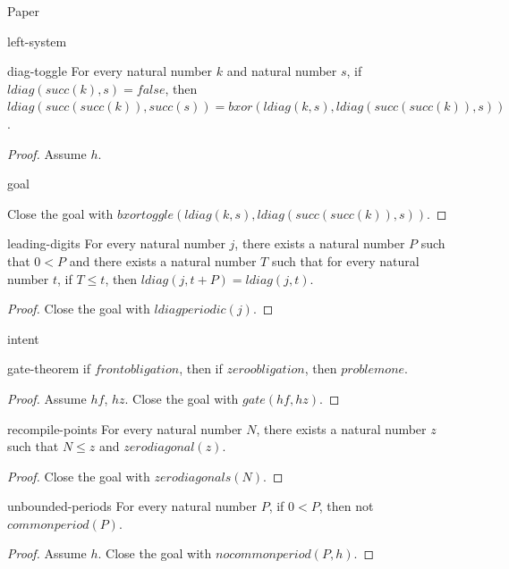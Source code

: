\begin{lexlean}{Paper}
\begin{section}{left-system}
  \begin{lemma}{diag-toggle}
  For every natural number \(k\) and natural number \(s\), if \(ldiag(succ(k), s) = false\), then \(ldiag(succ(succ(k)), succ(s)) = bxor(ldiag(k, s), ldiag(succ(succ(k)), s))\).
  \begin{proof}
  Assume \(h\).
  \begin{rewrite}{goal}
  \end{rewrite}
  Close the goal with \(bxortoggle(ldiag(k, s), ldiag(succ(succ(k)), s))\).
  \end{proof}
  \end{lemma}

  \begin{theorem}{leading-digits}
  For every natural number \(j\), there exists a natural number \(P\) such that \(0 < P\) and there exists a natural number \(T\) such that for every natural number \(t\), if \(T ≤ t\), then \(ldiag(j, t + P) = ldiag(j, t)\).
  \begin{proof}
  Close the goal with \(ldiagperiodic(j)\).
  \end{proof}
  \end{theorem}
\end{section}

\begin{section}{intent}
  \begin{theorem}{gate-theorem}
  if \(frontobligation\), then if \(zeroobligation\), then \(problemone\).
  \begin{proof}
  Assume \(hf\), \(hz\).
  Close the goal with \(gate(hf, hz)\).
  \end{proof}
  \end{theorem}

  \begin{theorem}{recompile-points}
  For every natural number \(N\), there exists a natural number \(z\) such that \(N ≤ z\) and \(zerodiagonal(z)\).
  \begin{proof}
  Close the goal with \(zerodiagonals(N)\).
  \end{proof}
  \end{theorem}

  \begin{theorem}{unbounded-periods}
  For every natural number \(P\), if \(0 < P\), then not \(commonperiod(P)\).
  \begin{proof}
  Assume \(h\).
  Close the goal with \(nocommonperiod(P, h)\).
  \end{proof}
  \end{theorem}
\end{section}


\end{lexlean}
